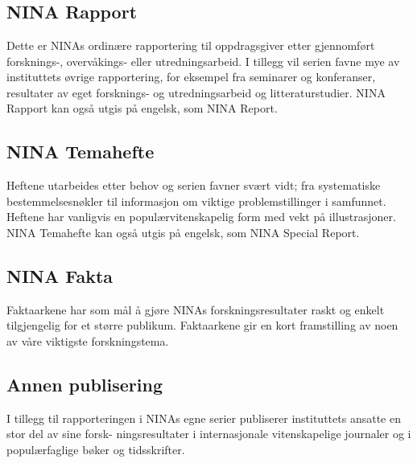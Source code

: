 \documentclass[11pt, a4paper]{article}
\begin{document}
\section*{}
\hspace{1ex}

\subsection*{\small{NINA Rapport}}
{\normalsize Dette er NINAs ordinære rapportering til oppdragsgiver etter gjennomført forsknings\hyp{}, overvåkings\hyp{} eller utredningsarbeid. I tillegg vil serien favne mye av instituttets øvrige rapportering, for eksempel fra seminarer og konferanser, resultater av eget forsknings\hyp{} og utredningsarbeid og litteraturstudier. NINA Rapport kan også utgis på engelsk, som NINA Report.
}

\subsection*{\small{NINA Temahefte}}
{\normalsize Heftene utarbeides etter behov og serien favner svært vidt; fra systematiske bestemmelsesnøkler til informasjon om viktige problemstillinger i samfunnet. Heftene har vanligvis en populærvitenskapelig form med vekt på illustrasjoner. NINA Temahefte kan også utgis på engelsk, som NINA Special Report.}

\subsection*{\small{NINA Fakta}}
{\normalsize Faktaarkene har som mål å gjøre NINAs forskningsresultater raskt og enkelt tilgjengelig for et større
publikum. Faktaarkene gir en kort framstilling av noen av våre viktigste forskningstema.}

\subsection*{\small{Annen publisering}}
{\normalsize I tillegg til rapporteringen i NINAs egne serier publiserer instituttets ansatte en stor del av sine forsk- ningsresultater i internasjonale vitenskapelige journaler og i populærfaglige bøker og tidsskrifter.}
\clearpage
{}
\setcounter{page}{1}
\vspace{2cm}
\end{document}
